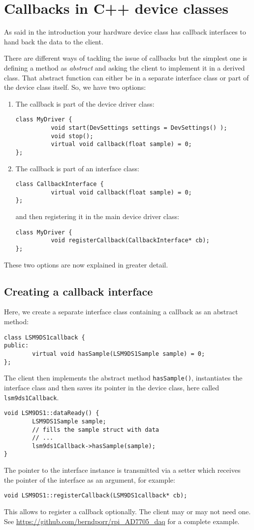 \documentclass[12pt]{report}
\begin{document}
\section{Callbacks in C++ device classes}
As said in the introduction your hardware device class has callback interfaces
to hand back the data to the client.

There are different ways of tackling the issue of callbacks but the
simplest one is defining a method as \textsl{abstract} and asking the
client to implement it in a derived class. That abstract function can
either be in a separate interface class or part of the device class
itself. So, we have two options:
\begin{enumerate}
\item The callback is part of the device driver class:
\begin{verbatim}
class MyDriver {
          void start(DevSettings settings = DevSettings() );
          void stop();
          virtual void callback(float sample) = 0;
};
\end{verbatim}
\item The callback is part of an interface class:
\begin{verbatim}
class CallbackInterface {
          virtual void callback(float sample) = 0;
};
\end{verbatim}
and then registering it in the main device driver class:
\begin{verbatim}
class MyDriver {
          void registerCallback(CallbackInterface* cb);
};
\end{verbatim}
\end{enumerate}
These two options are now explained in greater detail.


\subsection{Creating a callback interface}
Here, we create a separate interface class containing a callback
as an abstract method:
\begin{verbatim}
class LSM9DS1callback {
public:
        virtual void hasSample(LSM9DS1Sample sample) = 0;
};
\end{verbatim}

The client then implements the abstract method \texttt{hasSample()}, instantiates
the interface class and then saves its pointer in the device class, here called \texttt{lsm9ds1Callback}.
\begin{verbatim}
void LSM9DS1::dataReady() {
        LSM9DS1Sample sample;
        // fills the sample struct with data
        // ...
        lsm9ds1Callback->hasSample(sample);
}
\end{verbatim}
The pointer to the interface instance is transmitted via a setter which
receives the pointer of the interface as an argument, for example:
\begin{verbatim}
void LSM9DS1::registerCallback(LSM9DS1callback* cb);
\end{verbatim}
This allows to register a callback optionally. The client may or may not need
one.
See
\url{https://github.com/berndporr/rpi_AD7705_daq}
for a complete example.
\end{document}
